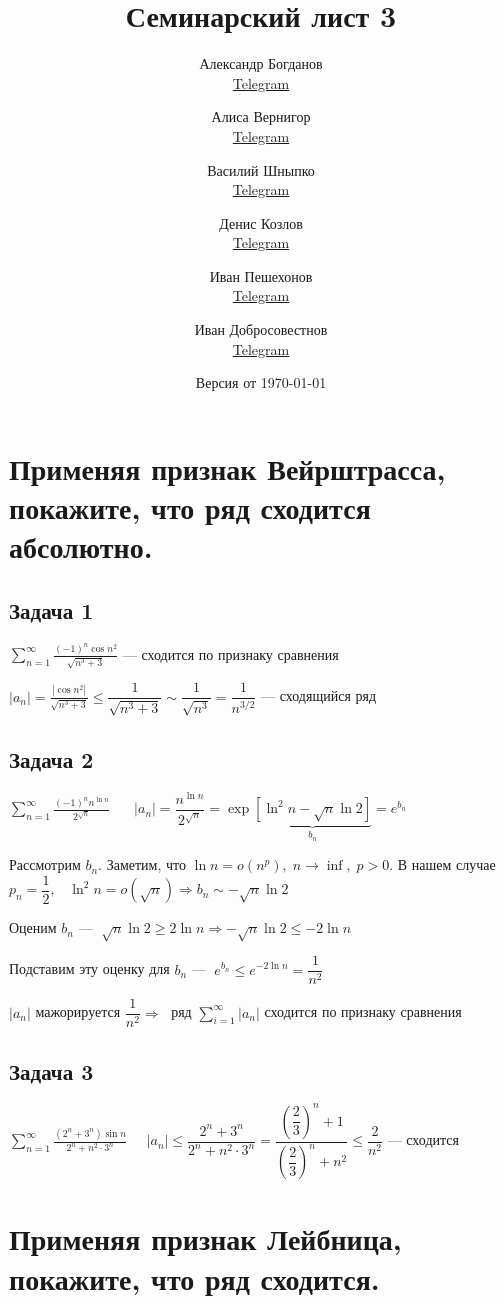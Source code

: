 \documentclass[a4paper,fleqn]{article}
\title{Семинарский лист 3}
\author{
	Александр Богданов \\ \href{https://t.me/SphericalPotatoInVacuum}{Telegram} \and
	Алиса Вернигор     \\ \href{https://t.me/allisyonok}{Telegram} \and
	Василий Шныпко     \\ \href{https://t.me/yourvash}{Telegram} \and
	Денис Козлов       \\ \href{https://t.me/DKozl50}{Telegram} \and
	Иван Пешехонов     \\ \href{https://t.me/JohanDDC}{Telegram}\and
	Иван Добросовестнов \\ \href{https://t.me/ivankot13}{Telegram}
}
\date{Версия от {\ddmmyyyydate\today} \currenttime}
\begin{document}
	\maketitle
	\section*{Применяя признак Вейрштрасса, покажите, что ряд сходится абсолютно.}
	\subsection*{Задача 1}
	$ \sum_{n=1}^{\infty} \frac{(-1)^{n} \cos n^{2}}{\sqrt{n^{3}+3}} $ --- сходится по признаку сравнения
	
	$ |a_n| = \frac{|\cos n^{2}|}{\sqrt{n^{3}+3}} \leq \dfrac{1}{\sqrt{n^{3}+3}} \sim \dfrac{1}{\sqrt{n^3}} = \dfrac{1}{n^{3/2}} $ --- сходящийся ряд
	
	\subsection*{Задача 2}
	$ \sum_{n=1}^{\infty} \frac{(-1)^{n} n^{\ln n}}{2^{\sqrt{n}}} $
	$\; \; \; \; \;  |a_n| = \dfrac{n^{\ln n}}{2^{\sqrt{n}}} = \exp \underbrace{\left[\ln^2 n - \sqrt{n}\ln 2\right]}_{b_n}  = e^{b_n}$
	
	Рассмотрим $ b_n $.
	Заметим, что $ \ln n  = o(n^p), \; n \to \inf, \; p>0$. В нашем случае $ p_n = \dfrac{1}{2}, \; \; \; \ln^2n = o(\sqrt{n}) \Rightarrow b_n \sim -\sqrt{n}\ln 2$ 
	
	Оценим $ b_n $   --- $ \; \sqrt{n}\ln2 \geq 2 \ln n \Rightarrow -\sqrt{n}\ln 2 \leq -2\ln n$
	
	Подставим эту оценку для $ b_n $ --- $\; e^{b_n} \leq e^{-2\ln n}  = \dfrac{1}{n^2}$ 
	
	$ |a_n| $ мажорируется $ \dfrac{1}{n^2} \Rightarrow \;$ ряд $ \sum_{i = 1}^{\infty} |a_n|$ сходится по признаку сравнения 
	
	\subsection*{Задача 3}
	$ \sum_{n=1}^{\infty} \frac{\left(2^{n}+3^{n}\right) \sin n}{2^{n}+n^{2} \cdot 3^{n}} \; \; \; \; \; |a_n| \leq \dfrac{2^n + 3^n}{2^n + n^2\cdot 3^n}  = \dfrac{\left(\dfrac{2}{3}\right)^n+1 }{\left(\dfrac{2}{3}\right)^n + n^2} \leq\dfrac{2}{n^2}$ --- сходится
	\section*{Применяя признак Лейбница, покажите, что ряд сходится.}
\end{document}
